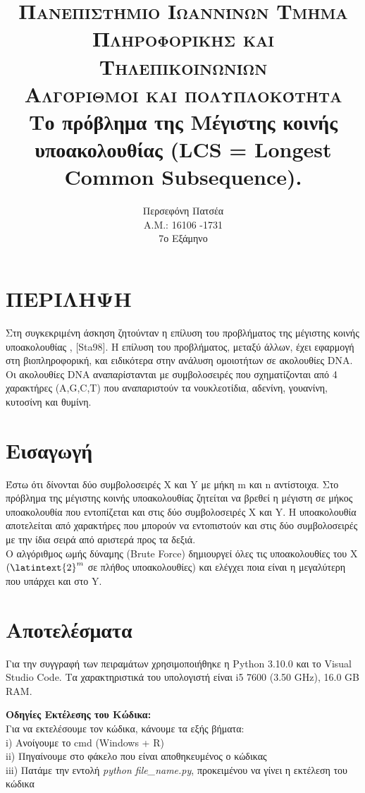 \documentclass[a4paper,12pt]{report}
\title{
	\usefont{OT1}{bch}{b}{n}
	\normalfont \normalsize \textsc{Πανεπιστήμιο Ιωαννίνων Τμήμα Πληροφορικής και Τηλεπικοινωνίων} \\ [1em]
	\normalfont \normalsize \textsc{Αλγόριθμοι και πολυπλοκότητα} \\[0.5cm]
	\huge Το πρόβλημα της Μέγιστης κοινής υποακολουθίας ({\lat LCS = Longest Common Subsequence}).
	\\[0.5cm]
}
\author{ Περσεφόνη Πατσέα 
	\\Α.Μ.: 16106 -1731 
	\\ 7ο Εξάμηνο}
\newcommand{\lat} {\latintext}
\begin{document}
	\maketitle
	
	\section*{ΠΕΡΙΛΗΨΗ} 
	Στη συγκεκριμένη άσκηση ζητούνταν η επίλυση του προβλήματος της μέγιστης κοινής υποακολουθίας {\lat [Bla20], [Sta98]}. Η επίλυση του προβλήματος, μεταξύ άλλων, έχει εφαρμογή στη βιοπληροφορική, και ειδικότερα στην ανάλυση ομοιοτήτων σε ακολουθίες {\lat DNA}. Οι ακολουθίες {\lat DNA} αναπαρίστανται με συμβολοσειρές που σχηματίζονται από 4 χαρακτήρες ({\lat A,G,C,T}) που αναπαριστούν τα νουκλεοτίδια, αδενίνη, γουανίνη, κυτοσίνη και θυμίνη.
	\vspace{0.5cm}
	
	\section{Εισαγωγή}
	Έστω ότι δίνονται δύο συμβολοσειρές {\lat X} και {\lat Y} με μήκη {\lat m} και {\lat n} αντίστοιχα. Στο πρόβλημα της μέγιστης κοινής υποακολουθίας ζητείται να βρεθεί η μέγιστη σε μήκος υποακολουθία που εντοπίζεται και στις δύο συμβολοσειρές {\lat X} και {\lat Y}. Η υποακολουθία αποτελείται από χαρακτήρες που μπορούν να εντοπιστούν και στις δύο συμβολοσειρές με την ίδια σειρά από αριστερά προς τα δεξιά.
	\\Ο αλγόριθμος ωμής δύναμης ({\lat Brute Force}) δημιουργεί όλες τις υποακολουθίες του {\lat X} $({\lat {2}^{m}}$ σε πλήθος υποακολουθίες) και ελέγχει ποια είναι η μεγαλύτερη που υπάρχει και στο {\lat Y}.
	\vspace{0.5cm}
	
	\section{Αποτελέσματα}
	Για την συγγραφή των πειραμάτων χρησιμοποιήθηκε η {\lat Python 3.10.0} και το {\lat Visual Studio Code}. Τα χαρακτηριστικά του υπολογιστή είναι {\lat i5 7600 (3.50 GHz), 16.0 GB RAM}.
	
	\vspace{0.7cm}
	
	\textbf{Οδηγίες Εκτέλεσης του Κώδικα:}
	\\Για να εκτελέσουμε τον κώδικα, κάνουμε τα εξής βήματα:
	\\ {\lat i)} Ανοίγουμε το {\lat cmd (Windows + R)}
	\\ {\lat ii)} Πηγαίνουμε στο φάκελο που είναι αποθηκευμένος ο κώδικας
	\\ {\lat iii)} Πατάμε την εντολή {\textit {\lat python file\_name.py}}, προκειμένου να γίνει η εκτέλεση του κώδικα
	 
\end{document}
